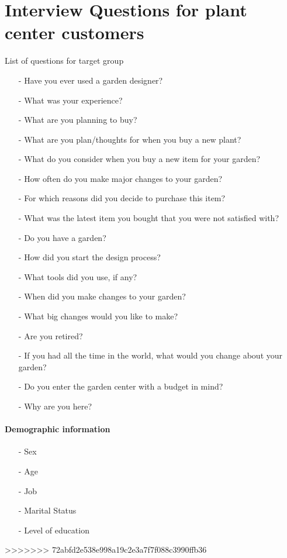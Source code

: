 \section*{Interview Questions for plant center customers}\label{sec:interviewQuestionsCustomer}
List of questions for target group
\begin{itemize}
	\item[-] Have you ever used a garden designer?
	\item[-] What was your experience?
	\item[-] What are you planning to buy?
	\item[-] What are you plan/thoughts for when you buy a new plant?
	\item[-] What do you consider when you buy a new item for your garden?
	\item[-] How often do you make major changes to your garden?
	\item[-] For which reasons did you decide to purchase this item?
	\item[-] What was the latest item you bought that you were not satisfied with?
	\item[-] Do you have a garden?
	\item[-] How did you start the design process?
	\item[-] What tools did you use, if any?
	\item[-] When did you make changes to your garden?
	\item[-] What big changes would you like to make?
	\item[-] Are you retired?
	\item[-] If you had all the time in the world, what would you change about your garden?
	\item[-] Do you enter the garden center with a budget in mind?
	\item[-] Why are you here? \\
\end{itemize}

\paragraph*{Demographic information}
\begin{itemize}
	\item[-] Sex
	\item[-] Age
	\item[-] Job
	\item[-] Marital Status
	\item[-] Level of education
\end{itemize}
>>>>>>> 72abfd2e538e998a19c2e3a7f7f088c3990ffb36

